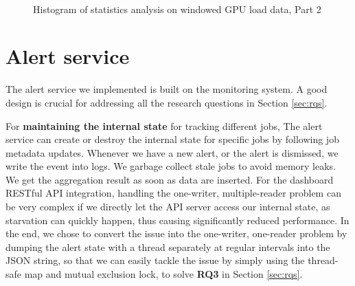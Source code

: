 \begin{figure}[H]
    \centering
        \\
    \caption{Histogram of statistics analysis on windowed GPU load data, Part 2}
    \label{fig_load_gpu_histogram_2}
\end{figure}

\section{Alert service}
\label{sec:alertservice}
The alert service we implemented is built on the monitoring system. A good design is crucial for addressing all the research questions in Section \ref{sec:rqs}.

For \textbf{maintaining the internal state} for tracking different jobs, The alert service can create or destroy the internal state for specific jobs by following job metadata updates. Whenever we have a new alert, or the alert is dismissed, we write the event into logs. We garbage collect stale jobs to avoid memory leaks. We get the aggregation result as soon as data are inserted. For the dashboard RESTful API integration, handling the one-writer, multiple-reader problem can be very complex if we directly let the API server access our internal state, as starvation can quickly happen, thus causing significantly reduced performance. In the end, we chose to convert the issue into the one-writer, one-reader problem by dumping the alert state with a thread separately at regular intervals into the JSON string, so that we can easily tackle the issue by simply using the thread-safe map and mutual exclusion lock, to solve \textbf{RQ3} in Section \ref{sec:rqs}.

